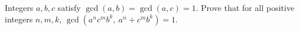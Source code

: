 Integers $a,b,c$ satisfy $\gcd(a,b)=\gcd(a,c)=1$. Prove that for all positive integers $n,m,k$, $\gcd\!\left(a^nc^mb^k,\ a^n+c^mb^k\right)=1$.
